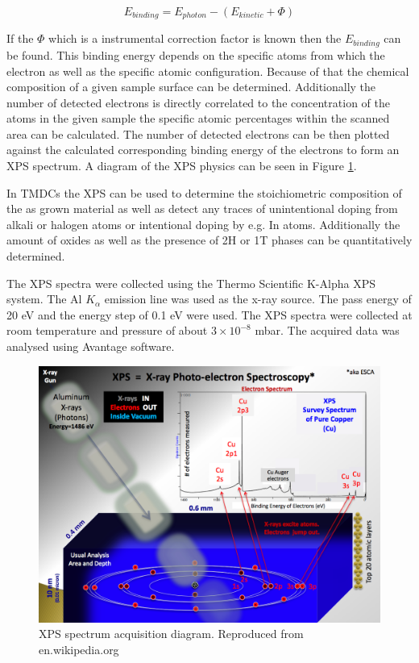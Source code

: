 \begin{equation}
E_{binding}  = E_{photon} - (E_{kinetic} + \Phi)
\label{eq:XPSEquation}
\end{equation}

If the $\Phi$ which is a instrumental correction factor is known then the $E_{binding}$ can be found. This binding energy depends on the specific atoms from which the electron as well as the specific atomic configuration. Because of that the chemical composition of a given sample surface can be determined. Additionally the number of detected electrons is directly correlated to the concentration of the atoms in the given sample the specific atomic percentages within the scanned area can be calculated. The number of detected electrons can be then plotted against the calculated corresponding binding energy of the electrons to form an XPS spectrum. A diagram of the XPS physics can be seen in Figure \ref{fig:MethodologyXPSSetup}.

In TMDCs the XPS can be used to determine the stoichiometric composition of the as grown material as well as detect any traces of unintentional doping from alkali or halogen atoms or intentional doping by e.g. In atoms. Additionally the amount of oxides as well as the presence of 2H or 1T phases can be quantitatively determined. 

The XPS spectra were collected using the Thermo Scientific K-Alpha XPS system. The Al $K_{\alpha}$ emission line was used as the x-ray source. The pass energy of 20 eV and the energy step of 0.1 eV were used. The XPS spectra were collected at room temperature and pressure of about $3 \times 10^{-8}$ mbar. The acquired data was analysed using Avantage software.

\begin{figure}[!ht]
	\begin{center}
		\includegraphics[scale=0.3]{Methodology/XPSSetup.png}
		\caption{XPS spectrum acquisition diagram. Reproduced from en.wikipedia.org}
		\label{fig:MethodologyXPSSetup}
	\end{center}
\end{figure}

